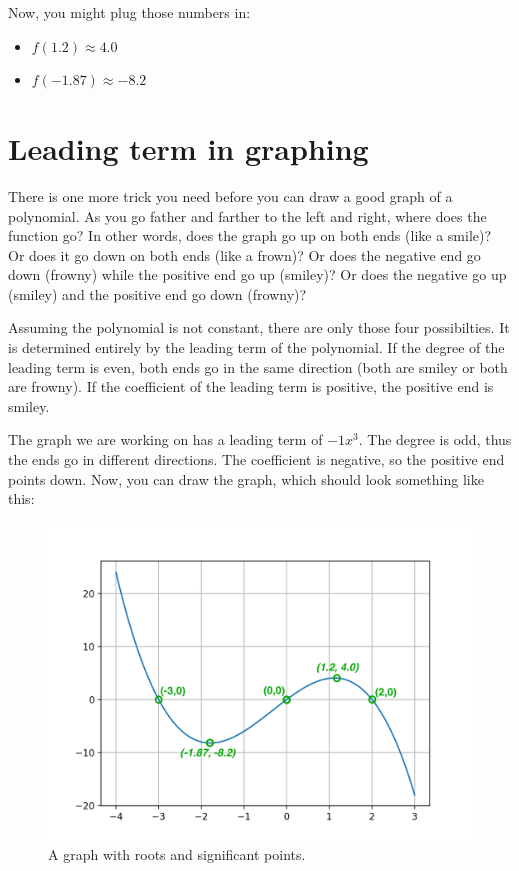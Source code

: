 Now, you might plug those numbers in:
\begin{itemize}
\item $f(1.2) \approx 4.0 $
\item $f(-1.87) \approx -8.2$
\end{itemize}

\section{Leading term in graphing}

There is one more trick you need before you can draw a good graph of a
polynomial. As you go father and farther to the left and right, where
does the function go? In other words, does the graph go up on both ends
(like a smile)? Or does it go down on both ends (like a frown)? Or
does the negative end go down (frowny) while the positive end go up
(smiley)? Or does the negative go up (smiley) and the positive end go
down (frowny)?

Assuming the polynomial is not constant, there are only those four
possibilties. It is determined entirely by the leading term of the
polynomial.  If the degree of the leading term is even, both ends go
in the same direction (both are smiley or both are frowny).  If the
coefficient of the leading term is positive, the positive end is
smiley.

The graph we are working on has a leading term of $-1x^3$. The degree is odd, thus the ends go in different directions. The coefficient is negative, so the positive end points down.  Now, you can draw the graph, which should look something like this:
\begin{figure}[htbp]
    \centering
    \includegraphics[width=\textwidth]{annotated_graph.png}
    \caption{A graph with roots and significant points.}
    \label{fig:annotated_graph}
\end{figure}
